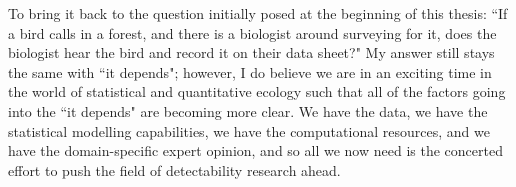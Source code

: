 \par To bring it back to the question initially posed at the beginning of this thesis: ``If a bird calls in a forest, and there is a biologist around surveying for it, does the biologist hear the bird and record it on their data sheet?"
My answer still stays the same with ``it depends"; however, I do believe we are in an exciting time in the world of statistical and quantitative ecology such that all of the factors going into the ``it depends" are becoming more clear.
We have the data, we have the statistical modelling capabilities, we have the computational resources, and we have the domain-specific expert opinion, and so all we now need is the concerted effort to push the field of detectability research ahead.

